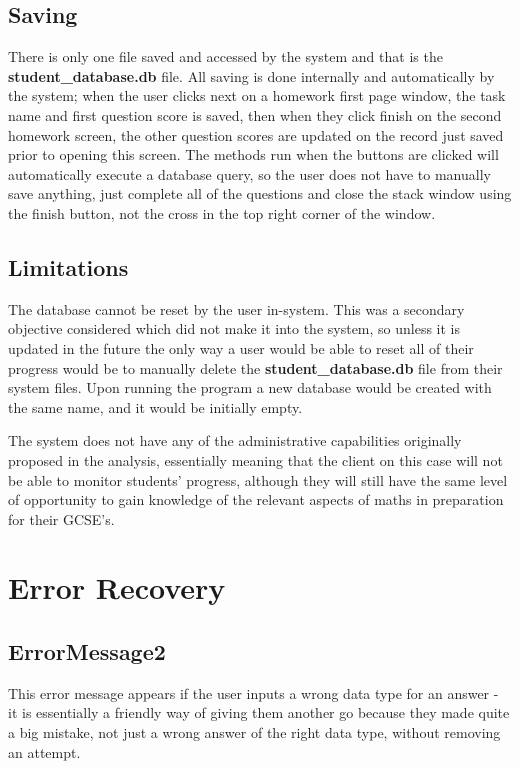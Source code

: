\subsection{Saving}

There is only one file saved and accessed by the system and that is the \textbf{student\_database.db} file. All saving is done internally and automatically by the system; when the user clicks next on a homework first page window, the task name and first question score is saved, then when they click finish on the second homework screen, the other question scores are updated on the record just saved prior to opening this screen. The methods run when the buttons are clicked will automatically execute a database query, so the user does not have to manually save anything, just complete all of the questions and close the stack window using the finish button, not the cross in the top right corner of the window.

\subsection{Limitations}

The database cannot be reset by the user in-system. This was a secondary objective considered which did not make it into the system, so unless it is updated in the future the only way a user would be able to reset all of their progress would be to manually delete the \textbf{student\_database.db} file from their system files. Upon running the program a new database would be created with the same name, and it would be initially empty.

The system does not have any of the administrative capabilities originally proposed in the analysis, essentially meaning that the client on this case will not be able to monitor students' progress, although they will still have the same level of opportunity to gain knowledge of the relevant aspects of maths in preparation for their GCSE's.

\section{Error Recovery}

\subsection{ErrorMessage2}

This error message appears if the user inputs a wrong data type for an answer - it is essentially a friendly way of giving them another go because they made quite a big mistake, not just a wrong answer of the right data type, without removing an attempt.

